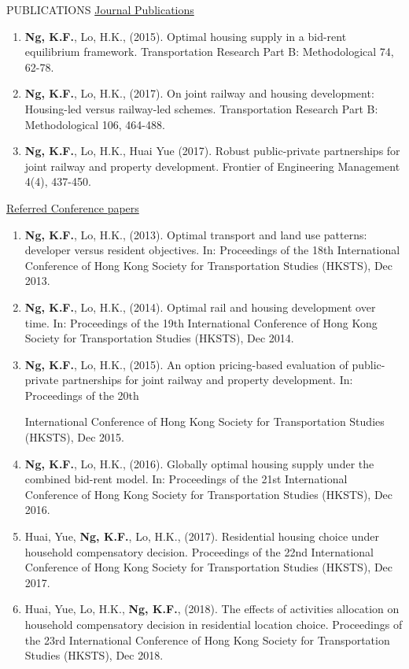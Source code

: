 \documentclass{resume} %
\begin{document}
\begin{rSection}{PUBLICATIONS}
\underline{Journal Publications}
\begin{enumerate}
\item \textbf{Ng, K.F.}, Lo, H.K., (2015). Optimal housing supply in a bid-rent
equilibrium framework. Transportation Research Part B: Methodological 74, 62-78.
\item \textbf{Ng, K.F.}, Lo, H.K., (2017). On joint railway and housing development:
Housing-led versus railway-led schemes. Transportation Research Part B: Methodological 106,
464-488.
\item \textbf{Ng, K.F.}, Lo, H.K., Huai Yue (2017). Robust public-private partnerships
for joint railway and property development. Frontier of Engineering Management 4(4), 437-450.
\end{enumerate}
\underline{Referred Conference papers}
\begin{enumerate}
\item \textbf{Ng, K.F.}, Lo, H.K., (2013). Optimal transport and land use patterns:
developer versus resident objectives. In: Proceedings of the 18th International Conference of
Hong Kong Society for Transportation Studies (HKSTS), Dec 2013.
\item \textbf{Ng, K.F.}, Lo, H.K., (2014). Optimal rail and housing development over
time. In: Proceedings of the 19th International Conference of Hong Kong Society for
Transportation Studies (HKSTS), Dec 2014.

\item \textbf{Ng, K.F.}, Lo, H.K., (2015). An option pricing-based evaluation of public-
private partnerships for joint railway and property development. In: Proceedings of the 20th

International Conference of Hong Kong Society for Transportation Studies (HKSTS), Dec 2015.
\item \textbf{Ng, K.F.}, Lo, H.K., (2016). Globally optimal housing supply under the
combined bid-rent model. In: Proceedings of the 21st International Conference of Hong Kong
Society for Transportation Studies (HKSTS), Dec 2016.
\item Huai, Yue, \textbf{Ng, K.F.}, Lo, H.K., (2017). Residential housing choice under
household compensatory decision. Proceedings of the 22nd International Conference of Hong
Kong Society for Transportation Studies (HKSTS), Dec 2017.
\item Huai, Yue, Lo, H.K., \textbf{Ng, K.F.}, (2018). The effects of activities allocation
on household compensatory decision in residential location choice. Proceedings of the 23rd
International Conference of Hong Kong Society for Transportation Studies (HKSTS), Dec 2018.


\end{enumerate}
\end{rSection}
\end{document}
